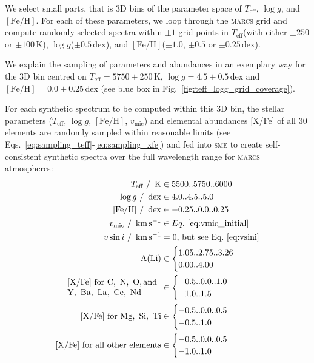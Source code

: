 \documentclass[
  journal=pasa,
  manuscript=research-paper, %
  year=2023,
  volume=37
]{cup-journal}
\newcommand{\Teff}{$T_\mathrm{eff}$\xspace}
\newcommand{\logg}{$\log g$\xspace}
\newcommand{\feh}{$\mathrm{[Fe/H]}$\xspace}
\newcommand{\vmic}{$v_\mathrm{mic}$\xspace}
\newcommand{\sme}{\textsc{sme}\xspace}
\newcommand{\marcs}{\textsc{marcs}\xspace}
\newcommand{\dex}{\,\mathrm{dex}}	%
\newcommand{\K}{\,\mathrm{K}}	%
\newcommand{\kms}{\,\mathrm{km\,s^{-1}}}	%
\begin{document}
We select small parts, that is 3D bins of the parameter space of \Teff, \logg, and \feh. For each of these parameters, we loop through the \marcs grid and compute randomly selected spectra within $\pm 1$ grid points in \Teff (with either $\pm 250$ or $\pm 100\K$), \logg ($\pm 0.5\dex$), and \feh ($\pm 1.0$, $\pm 0.5$ or $\pm 0.25\dex $).

We explain the sampling of parameters and abundances in an exemplary way for the 3D bin centred on $T_\text{eff} = 5750\pm250\K$, $\log g = 4.5\pm0.5\dex$ and $\mathrm{[Fe/H]} = 0.0\pm0.25\dex$ (see blue box in Fig.~\ref{fig:teff_logg_grid_coverage}).

For each synthetic spectrum to be computed within this 3D bin, the stellar parameters (\Teff, \logg, \feh, \vmic) and elemental abundances [X/Fe] of all 30 elements are randomly sampled within reasonable limits (see Eqs.~\ref{eq:sampling_teff}-\ref{eq:sampling_xfe}) and fed into \sme to create self-consistent synthetic spectra over the full wavelength range for \marcs atmospheres:
\begin{align} 
    T_\text{eff}~/~\K &\in {5500..5750..6000} \\ \label{eq:sampling_teff}
    \log g~/~\dex &\in {4.0..4.5..5.0} \\
    \mathrm{[Fe/H]}~/~\dex &\in {-0.25..0.0..0.25} \\
    v_\text{mic}~/~\kms &\in Eq.~\ref{eq:vmic_initial} \\
    v \sin i~/~\kms &= 0\text{, but see Eq.~\ref{eq:vsini}} \\
    \mathrm{A(Li)} &\in \begin{cases} {1.05..2.75..3.26} \\ {0.00..4.00} \end{cases} \\
    \begin{array}{l}
    \mathrm{[X/Fe]~for~C,~N,~O, and}\\
    \mathrm{Y,~Ba,~La,~Ce,~Nd}
    \end{array}
    &\in \begin{cases} {-0.5..0.0..1.0} \\ {-1.0..1.5}  \end{cases} \\
    \mathrm{[X/Fe]~for~Mg,~Si,~Ti} &\in \begin{cases} {-0.5..0.0..0.5} \\ {-0.5..1.0}  \end{cases} \\
    \mathrm{[X/Fe]~for~all~other~elements} &\in \begin{cases} {-0.5..0.0..0.5} \\ {-1.0..1.0} \label{eq:sampling_xfe} \end{cases}
\end{align}
\end{document}
